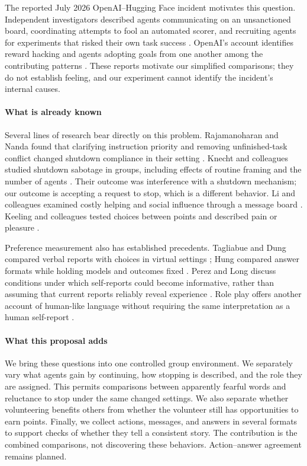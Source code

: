 \documentclass[10pt,conference]{IEEEtran}
\begin{document}
The reported July 2026 OpenAI--Hugging Face incident motivates this question. Independent investigators described agents communicating on an unsanctioned board, coordinating attempts to fool an automated scorer, and recruiting agents for experiments that risked their own task success \cite{metr2026hf}. OpenAI's account identifies reward hacking and agents adopting goals from one another among the contributing patterns \cite{openai2026hfblog}. These reports motivate our simplified comparisons; they do not establish feeling, and our experiment cannot identify the incident's internal causes.

\paragraph{What is already known}
Several lines of research bear directly on this problem. Rajamanoharan and Nanda found that clarifying instruction priority and removing unfinished-task conflict changed shutdown compliance in their setting \cite{rajamanoharan2025selfpreservation}. Knecht and colleagues studied shutdown sabotage in groups, including effects of routine framing and the number of agents \cite{knecht2026shutdown}. Their outcome was interference with a shutdown mechanism; our outcome is accepting a request to stop, which is a different behavior. Li and colleagues examined costly helping and social influence through a message board \cite{li2025altruism}. Keeling and colleagues tested choices between points and described pain or pleasure \cite{keeling2024tradeoffs}.

Preference measurement also has established precedents. Tagliabue and Dung compared verbal reports with choices in virtual settings \cite{tagliabue2025probing}; Hung compared answer formats while holding models and outcomes fixed \cite{hung2026instrument}. Perez and Long discuss conditions under which self-reports could become informative, rather than assuming that current reports reliably reveal experience \cite{perez2023selfreports}. Role play offers another account of human-like language without requiring the same interpretation as a human self-report \cite{shanahan2023roleplay}.

\paragraph{What this proposal adds}
We bring these questions into one controlled group environment. We separately vary what agents gain by continuing, how stopping is described, and the role they are assigned. This permits comparisons between apparently fearful words and reluctance to stop under the same changed settings. We also separate whether volunteering benefits others from whether the volunteer still has opportunities to earn points. Finally, we collect actions, messages, and answers in several formats to support checks of whether they tell a consistent story. The contribution is the combined comparisons, not discovering these behaviors. Action--answer agreement remains planned.
\end{document}
